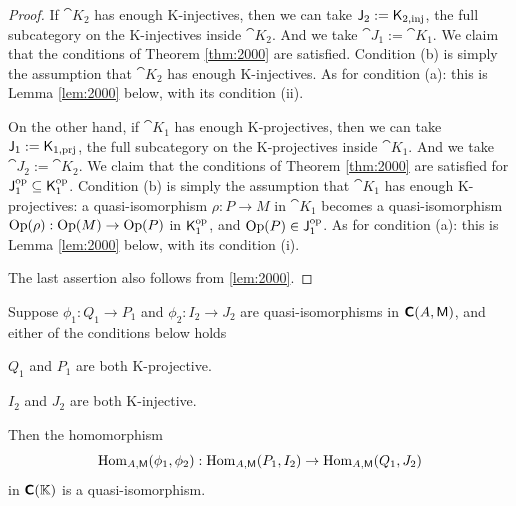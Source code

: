 \begin{proof}
If $\cat{K}_2$ has enough K-injectives, then we can take 
$\operatorname{\mathsf{J}}_2 := \operatorname{\mathsf{K}}_{2, \mathrm{inj}}$, the full subcategory on the K-injectives 
inside $\cat{K}_2$. And we take 
$\cat{J}_1 := \cat{K}_{1}$. 
We claim that the conditions of Theorem \ref{thm:2000} are satisfied. Condition 
(b) is simply the assumption that $\cat{K}_2$ has enough K-injectives. As for 
condition (a): this is Lemma 
\ref{lem:2000} below, with its condition (ii). 

On the other hand, if $\cat{K}_1$ has enough K-projectives, then we can take 
$\operatorname{\mathsf{J}}_1 := \operatorname{\mathsf{K}}_{1, \mathrm{prj}}$, 
the full subcategory on the K-projectives inside $\cat{K}_1$. 
And we take $\cat{J}_2 := \cat{K}_{2}$.
We claim that the conditions of Theorem \ref{thm:2000}  are satisfied for 
$\operatorname{\mathsf{J}}_1^{\mathrm{op}} \subseteq \operatorname{\mathsf{K}}_1^{\mathrm{op}}$. 
Condition (b) is simply the assumption that $\cat{K}_1$ has enough 
K-projectives: a quasi-isomorphism 
$\rho : P \to M$ in $\cat{K}_1$ becomes a quasi-isomorphism 
$\mathrm{Op}(\rho) : \mathrm{Op}(M) \to \mathrm{Op}(P)$ in 
$\operatorname{\mathsf{K}}_1^{\mathrm{op}}$, and 
$\mathrm{Op}(P) \in \operatorname{\mathsf{J}}_1^{\mathrm{op}}$.
As for condition (a): this is Lemma \ref{lem:2000} below,  with its condition 
(i). 

The last assertion also follows from \ref{lem:2000}.
\end{proof}

\begin{lem}  \label{lem:2000}
Suppose $\phi_1 : Q_1 \to P_1$ and $\phi_2 : I_2 \to J_2$
are quasi-iso\-morphisms in $\boldsymbol{\mathsf{C}}(A, \operatorname{\mathsf{M}})$, 
and either of the conditions below holds\tup{:}
\begin{enumerate}
 $Q_1$ and $P_1$ are both K-projective. 

 $I_2$ and $J_2$ are both K-injective.
\end{enumerate}
Then the homomorphism
\[  \operatorname{Hom}_{A, \operatorname{\mathsf{M}}}(\phi_1, \phi_2) : 
\operatorname{Hom}_{A, \operatorname{\mathsf{M}}}(P_1, I_2) \to \operatorname{Hom}_{A, \operatorname{\mathsf{M}}}(Q_1, J_2) \]
in $\boldsymbol{\mathsf{C}}(\mathbb{K})$ is a quasi-isomorphism. 
\end{lem}

